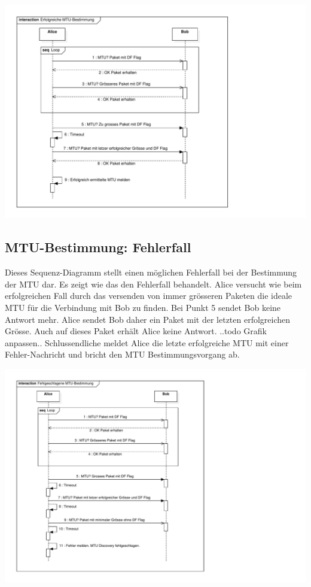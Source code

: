 
\includegraphics[trim=10 10 200 10,clip,width=\textwidth]{mainpart/implementation/img/MTUBestimmungErfolgreich}

\subsection{MTU-Bestimmung: Fehlerfall}
Dieses Sequenz-Diagramm stellt einen möglichen Fehlerfall bei der Bestimmung der MTU dar. Es zeigt wie das \tool den Fehlerfall behandelt. Alice versucht wie beim erfolgreichen Fall durch das versenden von immer grösseren Paketen die ideale MTU für die Verbindung mit Bob zu finden. Bei Punkt 5 sendet Bob keine Antwort mehr. Alice sendet Bob daher ein Paket mit der letzten erfolgreichen Grösse. Auch auf dieses Paket erhält Alice keine Antwort.  ..todo Grafik anpassen..
Schlussendliche meldet Alice die letzte erfolgreiche MTU mit einer Fehler-Nachricht und bricht den MTU Bestimmungsvorgang ab.

\includegraphics[trim=10 10 265 10,clip,width=\textwidth]{mainpart/implementation/img/MTUBestimmungFehlerfall}